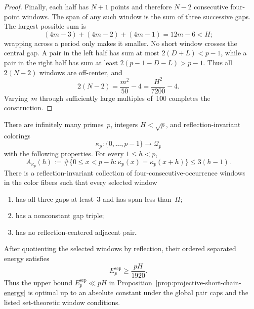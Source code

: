 \begin{proof}
Finally, each half has $N+1$ points and therefore $N-2$ consecutive
four-point windows.  The span of any such window is the sum of three
successive gaps.  The largest possible sum is
\[
 (4m-3)+(4m-2)+(4m-1)=12m-6<H;
\]
wrapping across a period only makes it smaller.  No short window crosses
the central gap.  A pair in the left half has sum at most
$2(D+L)<p-1$,
while a pair in the right half has sum at least
$2(p-1-D-L)>p-1$.  Thus all $2(N-2)$ windows are off-center, and
\[
 2(N-2)=\frac{m^2}{50}-4=\frac{H^2}{7200}-4.
\]
Varying~$m$ through sufficiently large multiples of~$100$ completes the
construction.
\end{proof}

\begin{proposition}
\label{prop:colored-pair-cap-energy-sharp}
There are infinitely many primes~$p$, integers
$H<\sqrt p$, and reflection-invariant colorings
\[
 \kappa_p:\{0,\ldots,p-1\}\longrightarrow\mathscr Q_p
\]
with the following properties.  For every $1\le h<p$,
\begin{equation}
 A_{\kappa_p}(h)
 :=\#\{0\le x<p-h:\kappa_p(x)=\kappa_p(x+h)\}
 \le3(h-1).
\label{eq:colored-global-pair-cap}
\end{equation}
There is a reflection-invariant collection of four-consecutive-occurrence
windows in the color fibers such that every selected window
\begin{enumerate}
\item has all three gaps at least~$3$ and has span less than~$H$;
\item has a nonconstant gap triple;
\item has no reflection-centered adjacent pair.
\end{enumerate}
After quotienting the selected windows by reflection, their ordered
separated energy satisfies
\begin{equation}
 E_p^{\mathrm{sep}}\ge\frac{pH}{1920}.
\label{eq:colored-energy-lower}
\end{equation}
Thus the upper bound $E_p^{\mathrm{sep}}\ll pH$ in
Proposition~\ref{prop:projective-short-chain-energy} is optimal up to an
absolute constant under the global pair caps and the listed set-theoretic
window conditions.
\end{proposition}

